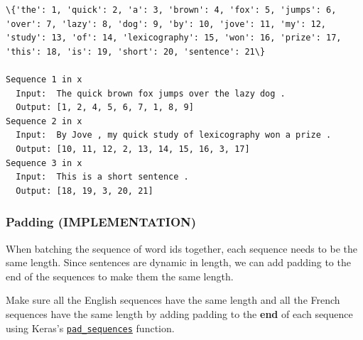 \documentclass[11pt]{article}
\begin{document}
    \begin{Verbatim}[commandchars=\\\{\}]
\{'the': 1, 'quick': 2, 'a': 3, 'brown': 4, 'fox': 5, 'jumps': 6, 'over': 7, 'lazy': 8, 'dog': 9, 'by': 10, 'jove': 11, 'my': 12, 'study': 13, 'of': 14, 'lexicography': 15, 'won': 16, 'prize': 17, 'this': 18, 'is': 19, 'short': 20, 'sentence': 21\}

Sequence 1 in x
  Input:  The quick brown fox jumps over the lazy dog .
  Output: [1, 2, 4, 5, 6, 7, 1, 8, 9]
Sequence 2 in x
  Input:  By Jove , my quick study of lexicography won a prize .
  Output: [10, 11, 12, 2, 13, 14, 15, 16, 3, 17]
Sequence 3 in x
  Input:  This is a short sentence .
  Output: [18, 19, 3, 20, 21]

    \end{Verbatim}

    \subsubsection{Padding (IMPLEMENTATION)}\label{padding-implementation}

When batching the sequence of word ids together, each sequence needs to
be the same length. Since sentences are dynamic in length, we can add
padding to the end of the sequences to make them the same length.

Make sure all the English sequences have the same length and all the
French sequences have the same length by adding padding to the
\textbf{end} of each sequence using Keras's
\href{https://keras.io/preprocessing/sequence/\#pad_sequences}{\texttt{pad\_sequences}}
function.
\end{document}
